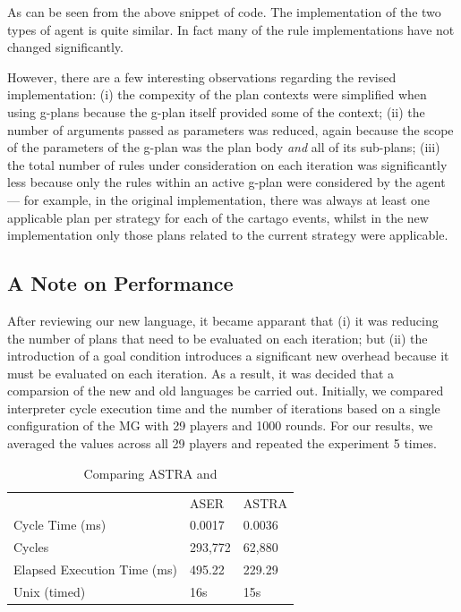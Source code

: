 As can be seen from the above snippet of code. The implementation of the two types of agent
is quite similar. In fact many of the rule implementations have not changed significantly.

However, there are a few interesting observations regarding the revised implementation: (i) the 
compexity of the plan contexts were simplified when using g-plans because the g-plan itself 
provided some of the context; (ii) the number of arguments passed as parameters was reduced, 
again because the scope of the parameters of the g-plan was the plan body \emph{and} all of 
its sub-plans; (iii) the total number of rules under consideration on each iteration was
significantly less because only the rules within an active g-plan were considered by the
agent --- for example, in the original implementation, there was always at least one
applicable plan per strategy for each of the cartago events, whilst in the 
new implementation only those plans related to the current strategy were applicable.

\subsection{A Note on Performance}
\label{performance}

After reviewing our new language, it became apparant that (i) it was reducing the number of plans 
that need to be evaluated on each iteration; but (ii) the introduction of a goal condition introduces
a significant new overhead because it must be evaluated on each iteration.
As a result, it was decided that a comparsion of the new and old languages be carried out. Initially,
we compared interpreter cycle execution time and the number of iterations based on a single 
configuration of the MG with 29 players and 1000 rounds. For our results, we averaged
the values across all 29 players and repeated the experiment 5 times.

\begin{table}[]
\centering
\caption{Comparing ASTRA and {\aser}}
\label{comparison}
\begin{tabular}{lll}
                            & ASER    & ASTRA  \\
Cycle Time (ms)             & 0.0017  & 0.0036 \\
Cycles                      & 293,772 & 62,880 \\
Elapsed Execution Time (ms) & 495.22  & 229.29 \\
Unix (timed)                & 16s     & 15s   
\end{tabular}
\end{table}

